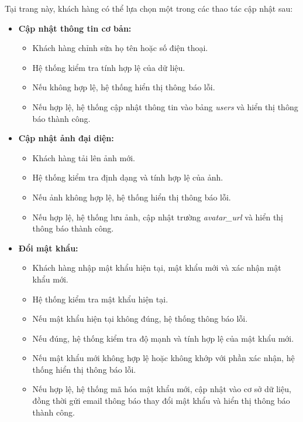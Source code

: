 Tại trang này, khách hàng có thể lựa chọn một trong các thao tác cập nhật sau:

\begin{itemize}
    \item \textbf{Cập nhật thông tin cơ bản:}
    \begin{itemize}
        \item Khách hàng chỉnh sửa họ tên hoặc số điện thoại.
        
        \item Hệ thống kiểm tra tính hợp lệ của dữ liệu.
        
        \item Nếu không hợp lệ, hệ thống hiển thị thông báo lỗi.
        
        \item Nếu hợp lệ, hệ thống cập nhật thông tin vào bảng \textit{users} và hiển thị thông báo thành công.
    \end{itemize}
    
    \item \textbf{Cập nhật ảnh đại diện:}
    \begin{itemize}
        \item Khách hàng tải lên ảnh mới.
        
        \item Hệ thống kiểm tra định dạng và tính hợp lệ của ảnh.
        
        \item Nếu ảnh không hợp lệ, hệ thống hiển thị thông báo lỗi.
        
        \item Nếu hợp lệ, hệ thống lưu ảnh, cập nhật trường \textit{avatar\_url} và hiển thị thông báo thành công.
    \end{itemize}
    
    \item \textbf{Đổi mật khẩu:}
    \begin{itemize}
        \item Khách hàng nhập mật khẩu hiện tại, mật khẩu mới và xác nhận mật khẩu mới.
        
        \item Hệ thống kiểm tra mật khẩu hiện tại.
        
        \item Nếu mật khẩu hiện tại không đúng, hệ thống thông báo lỗi.
        
        \item Nếu đúng, hệ thống kiểm tra độ mạnh và tính hợp lệ của mật khẩu mới.
        
        \item Nếu mật khẩu mới không hợp lệ hoặc không khớp với phần xác nhận, hệ thống hiển thị thông báo lỗi.
        
        \item Nếu hợp lệ, hệ thống mã hóa mật khẩu mới, cập nhật vào cơ sở dữ liệu, đồng thời gửi email thông báo thay đổi mật khẩu và hiển thị thông báo thành công.
    \end{itemize}
\end{itemize}

